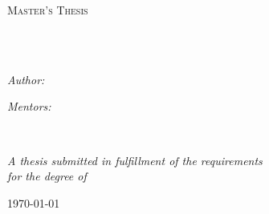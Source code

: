 \documentclass[
11pt, %
english, %
singlespacing, %
headsepline, %
]{MastersDoctoralThesis} %
\author{Jakob \textsc{Jenko, BSc}} %
\begin{document}
\frontmatter %

\pagestyle{plain} %


\begin{titlepage}
\begin{center}

\vspace*{.06\textheight}
{\scshape\LARGE \univname\par}\vspace{1.5cm} %
\textsc{\Large Master’s Thesis}\\[0.5cm] %

\HRule \\[0.4cm] %
{\huge \bfseries \ttitle\par}\vspace{0.4cm} %
\HRule \\[1.5cm] %
 
\begin{minipage}[t]{0.4\textwidth}
\begin{flushleft} \large
\emph{Author:}\\
\href{}{\authorname} %
\end{flushleft}
\end{minipage}
\begin{minipage}[t]{0.4\textwidth}
\begin{flushright} \large
\emph{Mentors:} \\
\href{}{\supname} %
\end{flushright}
\end{minipage}\\[3cm]
 
\vfill

\large \textit{A thesis submitted in fulfillment of the requirements\\ for the degree of \degreename}\\[0.3cm] %

 
\vfill

{\large \today}\\[4cm] %
 
\vfill
\end{center}
\end{titlepage}
\end{document}
